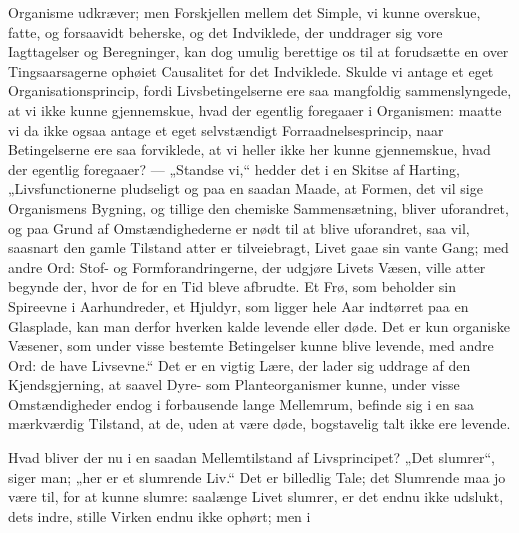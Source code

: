 \documentclass[12pt,a4paper]{book}
\begin{document}
Organisme udkræver; men Forskjellen mellem det Simple, vi kunne overskue,
fatte, og forsaavidt beherske, og det Indviklede, der unddrager sig vore
Iagttagelser og Beregninger, kan dog umulig berettige os til at
forudsætte en over Tingsaarsagerne ophøiet Causalitet for det Indviklede.
Skulde vi antage et eget Organisationsprincip, fordi Livsbetingelserne
ere saa mangfoldig sammenslyngede, at vi ikke kunne gjennemskue, hvad der
egentlig foregaaer i Organismen: maatte vi da ikke ogsaa antage et eget
selvstændigt Forraadnelsesprincip, naar Betingelserne ere saa forviklede,
at vi heller ikke her kunne gjennemskue, hvad der egentlig foregaaer? —
„Standse vi,“ hedder det i en Skitse af Harting, „Livsfunctionerne
pludseligt og paa en saadan Maade, at Formen, det vil sige Organismens
Bygning, og tillige den chemiske Sammensætning, bliver uforandret, og
paa Grund af Omstændighederne er nødt til at blive uforandret, saa vil,
saasnart den gamle Tilstand atter er tilveiebragt, Livet gaae sin vante
Gang; med andre Ord: Stof- og Formforandringerne, der udgjøre Livets
Væsen, ville atter begynde der, hvor de for en Tid bleve afbrudte. Et
Frø, som beholder sin Spireevne i Aarhundreder, et Hjuldyr, som ligger
hele Aar indtørret paa en Glasplade, kan man derfor hverken kalde levende
eller døde. Det er kun organiske Væsener, som under visse bestemte
Betingelser kunne blive levende, med andre Ord: de have Livsevne.“ Det er
en vigtig Lære, der lader sig uddrage af den Kjendsgjerning, at saavel
Dyre- som Planteorganismer kunne, under visse Omstændigheder endog i
forbausende lange Mellemrum, befinde sig i en saa mærkværdig Tilstand, at
de, uden at være døde, bogstavelig talt ikke ere levende.

Hvad bliver der nu i en saadan Mellemtilstand af Livsprincipet? „Det
slumrer“, siger man; „her er et slumrende Liv.“ Det er billedlig Tale;
det Slumrende maa jo være til, for at kunne slumre: saalænge Livet
slumrer, er det endnu ikke udslukt, dets indre, stille Virken endnu ikke
ophørt; men i
\end{document}
